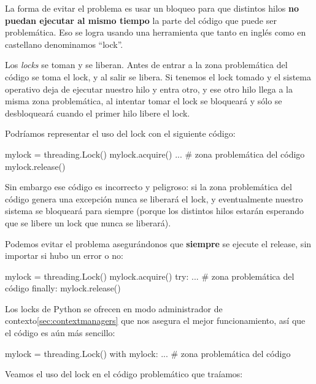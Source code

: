La forma de evitar el problema es usar un bloqueo para que distintos hilos \textbf{no puedan ejecutar al mismo tiempo} la parte del código que puede ser problemática. Eso se logra usando una herramienta que tanto en inglés como en castellano denominamos ``lock''.

Los \textit{locks} se toman y se liberan. Antes de entrar a la zona problemática del código se toma el lock, y al salir se libera. Si tenemos el lock tomado y el sistema operativo deja de ejecutar nuestro hilo y entra otro, y ese otro hilo llega a la misma zona problemática, al intentar tomar el lock se bloqueará y sólo se desbloqueará cuando el primer hilo libere el lock.

Podríamos representar el uso del lock con el siguiente código:

\begin{py}
mylock = threading.Lock()
mylock.acquire()
... # zona problemática del código
mylock.release()
\end{py}

Sin embargo ese código es incorrecto y peligroso: si la zona problemática del código genera una excepción nunca se liberará el lock, y eventualmente nuestro sistema se bloqueará para siempre (porque los distintos hilos estarán esperando que se libere un lock que nunca se liberará).

Podemos evitar el problema asegurándonos que \textbf{siempre} se ejecute el release, sin importar si hubo un error o no:

\begin{py}
mylock = threading.Lock()
mylock.acquire()
try:
    ... # zona problemática del código
finally:
    mylock.release()
\end{py}

Los locks de Python se ofrecen en modo administrador de contexto\ref{sec:contextmanagers} que nos asegura el mejor funcionamiento, así que el código es aún más sencillo:

\begin{py}
mylock = threading.Lock()
with mylock:
    ... # zona problemática del código
\end{py}

Veamos el uso del lock en el código problemático que traíamos:



